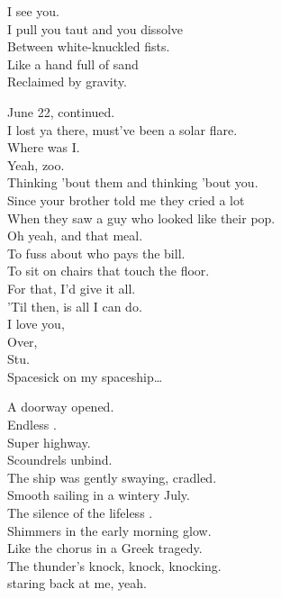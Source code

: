 I see you. \\
I pull you taut and you dissolve \\
Between white-knuckled fists. \\
Like a hand full of sand \\
Reclaimed by gravity. \\


June 22, continued. \\
I lost ya there, must've been a solar flare. \\
Where was I. \\
Yeah, zoo. \\
Thinking 'bout them and thinking 'bout you. \\
Since your brother told me they cried a lot \\
When they saw a guy who looked like their pop. \\
Oh yeah, and that meal. \\
To fuss about who pays the bill. \\
To sit on chairs that touch the floor. \\
For that, I'd give it all. \\
'Til then,  is all I can do. \\
I love you, \\
Over, \\
Stu. \\

Spacesick on my spaceship… \\





A doorway opened. \\
Endless . \\
Super highway. \\
Scoundrels unbind. \\
The ship was gently swaying, cradled. \\
Smooth sailing in a wintery July. \\
The silence of the lifeless . \\
Shimmers in the early morning glow. \\
Like the chorus in a Greek tragedy. \\
The thunder's knock, knock, knocking. \\
 staring back at me, yeah. \\

